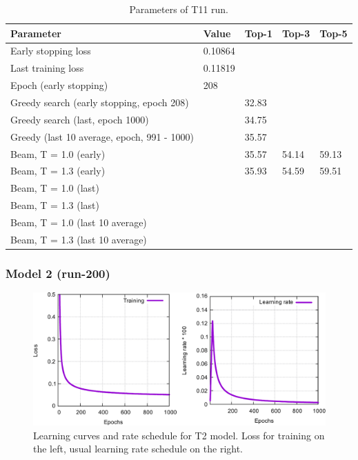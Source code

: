 \documentclass{article}
\begin{document}
\begin{table}[h!]
\caption{Parameters of T11 run.}
  \centering
  \begin{tabular}{p{8.2cm}p{1.5cm}p{1.5cm}p{1.5cm}p{1.5cm}}
    \toprule
    Parameter & Value & Top-1 & Top-3 & Top-5 \\
    \midrule
    Early stopping loss & 0.10864 & & & \\
    Last training loss & 0.11819 & & & \\
    Epoch (early stopping) & 208 & & & \\
    \midrule
    Greedy search (early stopping, epoch 208) & & 32.83 & &\\
    Greedy search (last, epoch 1000) & & 34.75 & & \\
    Greedy (last 10 average, epoch, 991 - 1000) & & 35.57 & & \\
    \midrule
    Beam, T = 1.0 (early) & & 35.57 & 54.14 & 59.13 \\
    Beam, T = 1.3 (early) & & 35.93 & 54.59 & 59.51 \\ 
    \midrule
    Beam, T = 1.0 (last) & &  &  &  \\
    Beam, T = 1.3 (last) & \\ 
    \midrule
    Beam, T = 1.0 (last 10 average) & &  &  &  \\
    Beam, T = 1.3 (last 10 average) & \\ 
    \bottomrule
  \end{tabular}
  \label{tbl:t11}

\end{table} 

\newpage
 \subsubsection{Model 2 (run-200)}
 
\begin{figure}[h!]
  \centering
  \includegraphics[width = 16.5cm]{images/t2-1.pdf}
  \caption{Learning curves and rate schedule for T2 model. Loss for training on the left, usual learning rate schedule on the right.}
  \label{fig:t21}
\end{figure}
\end{document}

